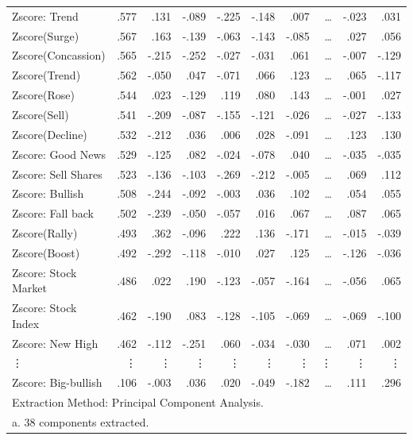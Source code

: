 \documentclass[review,3p,times,12pt,number]{elsarticle}
\begin{document}
\begin{table}[htbp]
\begin{tabular}{rrrrrrrrrr}
    \multicolumn{1}{l}{Zscore:  Trend} & .577  & .131  & -.089 & -.225 & -.148 & .007  & \ldots     & -.023 & .031 \\
    \multicolumn{1}{l}{Zscore(Surge)} & .567  & .163  & -.139 & -.063 & -.143 & -.085 & \ldots     & .027  & .056 \\
    \multicolumn{1}{l}{Zscore(Concassion)} & .565  & -.215 & -.252 & -.027 & -.031 & .061  & \ldots     & -.007 & -.129 \\
    \multicolumn{1}{l}{Zscore(Trend)} & .562  & -.050 & .047  & -.071 & .066  & .123  & \ldots     & .065  & -.117 \\
    \multicolumn{1}{l}{Zscore(Rose)} & .544  & .023  & -.129 & .119  & .080  & .143  & \ldots     & -.001 & .027 \\
    \multicolumn{1}{l}{Zscore(Sell)} & .541  & -.209 & -.087 & -.155 & -.121 & -.026 & \ldots     & -.027 & -.133 \\
    \multicolumn{1}{l}{Zscore(Decline)} & .532  & -.212 & .036  & .006  & .028  & -.091 & \ldots     & .123  & .130 \\
    \multicolumn{1}{l}{Zscore:  Good News} & .529  & -.125 & .082  & -.024 & -.078 & .040  & \ldots     & -.035 & -.035 \\
    \multicolumn{1}{l}{Zscore:  Sell Shares} & .523  & -.136 & -.103 & -.269 & -.212 & -.005 & \ldots     & .069  & .112 \\
    \multicolumn{1}{l}{Zscore:  Bullish} & .508  & -.244 & -.092 & -.003 & .036  & .102  & \ldots     & .054  & .055 \\
    \multicolumn{1}{l}{Zscore:  Fall back} & .502  & -.239 & -.050 & -.057 & .016  & .067  & \ldots     & .087  & .065 \\
    \multicolumn{1}{l}{Zscore(Rally)} & .493  & .362  & -.096 & .222  & .136  & -.171 & \ldots     & -.015 & -.039 \\
    \multicolumn{1}{l}{Zscore(Boost)} & .492  & -.292 & -.118 & -.010 & .027  & .125  & \ldots     & -.126 & -.036 \\
    \multicolumn{1}{l}{Zscore:  Stock Market} & .486  & .022  & .190  & -.123 & -.057 & -.164 & \ldots     & -.056 & .065 \\
    \multicolumn{1}{l}{Zscore:  Stock Index} & .462  & -.190 & .083  & -.128 & -.105 & -.069 & \ldots     & -.069 & -.100 \\
    \multicolumn{1}{l}{Zscore:  New High} & .462  & -.112 & -.251 & .060  & -.034 & -.030 & \ldots     & .071  & .002 \\
    \multicolumn{1}{l}{\vdots} & \vdots     & \vdots     & \vdots     & \vdots    & \vdots     & \vdots     & \vdots     & \vdots     & \vdots \\
    \multicolumn{1}{l}{Zscore:  Big-bullish} & .106  & -.003 & .036  & .020  & -.049 & -.182 & \ldots     & .111  & .296 \\
    \multicolumn{10}{l}{Extraction Method: Principal Component Analysis.} \\
    \multicolumn{10}{l}{a. 38 components extracted.} \\
    \bottomrule
    \end{tabular}%
  \label{tab:weibo:loading matrix}%
\end{table}%
\end{document}
